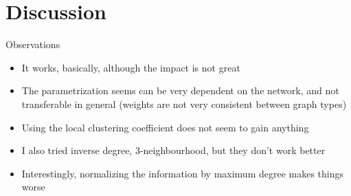\documentclass{beamer}
\begin{document}
\section{Discussion}
\begin{frame}{Observations}
  \begin{itemize}
  \item It works, basically, although the impact is not great
  \item The parametrization seems can be very dependent on the network, and not transferable in
    general (weights are not very consistent between graph types)
  \item Using the local clustering coefficient does not seem to gain anything
  \item I also tried inverse degree, 3-neighbourhood, but they don't work better
  \item Interestingly, normalizing the information by maximum degree makes things worse
  \end{itemize}
\end{frame}


\end{document}
